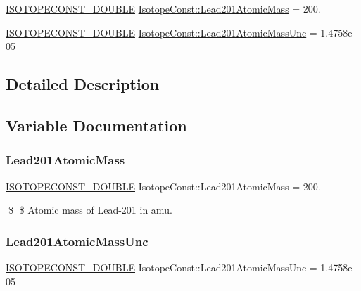 \begin{DoxyCompactItemize}
\item 
\mbox{\hyperlink{group___isotope_const-_macros_ga8f45a7272ce02c0b4c65c44636ed719a}{I\+S\+O\+T\+O\+P\+E\+C\+O\+N\+S\+T\+\_\+\+D\+O\+U\+B\+LE}} \mbox{\hyperlink{group___isotope_const-_lead-_pb201_ga764635fe752567e203eff5910881c697}{Isotope\+Const\+::\+Lead201\+Atomic\+Mass}} = 200.
\item 
\mbox{\hyperlink{group___isotope_const-_macros_ga8f45a7272ce02c0b4c65c44636ed719a}{I\+S\+O\+T\+O\+P\+E\+C\+O\+N\+S\+T\+\_\+\+D\+O\+U\+B\+LE}} \mbox{\hyperlink{group___isotope_const-_lead-_pb201_ga77cfd62f462378f8cdbe9e1cd60e78e9}{Isotope\+Const\+::\+Lead201\+Atomic\+Mass\+Unc}} = 1.\+4758e-\/05
\end{DoxyCompactItemize}


\subsection{Detailed Description}


\subsection{Variable Documentation}
\mbox{\label{group___isotope_const-_lead-_pb201_ga764635fe752567e203eff5910881c697}} 
\subsubsection{\texorpdfstring{Lead201\+Atomic\+Mass}{Lead201AtomicMass}}
{\footnotesize\ttfamily \mbox{\hyperlink{group___isotope_const-_macros_ga8f45a7272ce02c0b4c65c44636ed719a}{I\+S\+O\+T\+O\+P\+E\+C\+O\+N\+S\+T\+\_\+\+D\+O\+U\+B\+LE}} Isotope\+Const\+::\+Lead201\+Atomic\+Mass = 200.}

\$ \$ Atomic mass of Lead-\/201 in amu. \mbox{\label{group___isotope_const-_lead-_pb201_ga77cfd62f462378f8cdbe9e1cd60e78e9}} 
\subsubsection{\texorpdfstring{Lead201\+Atomic\+Mass\+Unc}{Lead201AtomicMassUnc}}
{\footnotesize\ttfamily \mbox{\hyperlink{group___isotope_const-_macros_ga8f45a7272ce02c0b4c65c44636ed719a}{I\+S\+O\+T\+O\+P\+E\+C\+O\+N\+S\+T\+\_\+\+D\+O\+U\+B\+LE}} Isotope\+Const\+::\+Lead201\+Atomic\+Mass\+Unc = 1.\+4758e-\/05}

